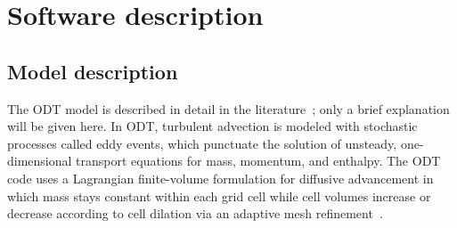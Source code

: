 \documentclass[preprint,12pt, a4paper]{elsarticle}
\begin{document}

\section{Software description}
\label{sec:description}

\subsection{Model description}
\label{sub:model_description}

The ODT model is described in detail in the literature~\cite{Kerstein_1999,Kerstein_2001,Ashurst_2005,Lignell_2018,Lignell_2013}; only a brief explanation will be given here. In ODT, turbulent advection is modeled with stochastic processes called eddy events, which punctuate the solution of unsteady, one-dimensional transport equations for mass, momentum, and enthalpy. The ODT code uses a Lagrangian finite-volume formulation for diffusive advancement in which mass stays constant within each grid cell while cell volumes increase or decrease according to cell dilation via an adaptive mesh refinement~\cite{Lignell_2013}.
\end{document}
